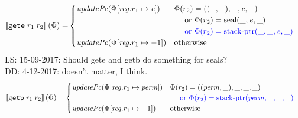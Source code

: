 \documentclass[a3paper]{article}
\newcommand\lau[1]{{\color{purple} \sf \footnotesize {LS: #1}}\\}
\newcommand\dominique[1]{{\color{purple} \sf \footnotesize {DD: #1}}\\}
\newcommand{\sem}[1]{\left\llbracket #1 \right\rrbracket}
\newcommand{\tor}{\text{ or }}
\newcommand{\totherwise}{\text{otherwise }}
\newcommand{\sourcecolor}{\color{blue}}
\newcommand{\src}[1]{{\sourcecolor #1}}
\newcommand{\targetcolor}[1]{\color{black}}
\newcommand{\trg}[1]{{\targetcolor{} #1}}
\newcommand{\zinstr}[1]{\texttt{#1}}
\newcommand{\twoinstr}[3]{
  \ifthenelse{\equal{#2#3}{}}
  {\zinstr{#1}}
  {\zinstr{#1} \; #2 \; #3}
}
\newcommand{\tgete}[2]{\twoinstr{\trg{gete}}{#1}{#2}}
\newcommand{\tgetp}[2]{\twoinstr{\trg{getp}}{#1}{#2}}
\newcommand{\update}[2]{[#1 \mapsto #2]}
\newcommand{\updReg}[2]{\update{\reg.#1}{#2}}
\newcommand{\shareddom}[1]{\mathrm{#1}}
\newcommand{\perm}{\var{perm}}
\newcommand{\stkptr}[1]{\mathrm{stack\text{-}ptr}(#1)}
\newcommand{\seal}[1]{\shareddom{seal}(#1)}
\newcommand{\var}[1]{\mathit{#1}}
\newcommand{\reg}{\var{reg}}
\newcommand{\eaddr}{\var{e}}
\newcommand{\plainfun}[2]{
  \ifthenelse{\equal{#2}{}}
  {\mathit{#1}}
  {\mathit{#1}(#2)}
}
\newcommand{\updPcAddr}[1]{\plainfun{updatePc}{#1}}
\begin{document}
\begin{align*}
  \sem{\tgete{r_1}{r_2}}(\Phi) = & 
                                   \begin{cases}
                                     \updPcAddr{\Phi\updReg{r_1}{\eaddr}} & 
                                     \arraycolsep=0pt
                                     \begin{array}[t]{l}
                                       \Phi(r_2) = ((\_,\_),\_,\eaddr,\_) \\
                                       \quad \tor \Phi(r_2) = \seal{\_,\eaddr,\_} \\
                                       \quad \src{\tor \Phi(r_2) = \stkptr{\_,\_,\eaddr,\_} } \\
                                     \end{array} \\
                                     \updPcAddr{\Phi\updReg{r_1}{-1}} & \totherwise
                                   \end{cases}
\end{align*}
\lau{15-09-2017: Should gete and getb do something for seals?}
\dominique{4-12-2017: doesn't matter, I think.}

\begin{align*}
  \sem{\tgetp{r_1}{r_2}}(\Phi) = & 
                                   \begin{cases}
                                     \updPcAddr{\Phi\updReg{r_1}{\perm}} & 
                                     \arraycolsep=0pt
                                     \begin{array}[t]{l}
                                       \Phi(r_2) = ((\perm,\_),\_,\_,\_) \\
                                       \quad \src{\tor \Phi(r_2) = \stkptr{\perm,\_,\_,\_} } \\
                                     \end{array} \\
                                     \updPcAddr{\Phi\updReg{r_1}{-1}} & \totherwise
                                   \end{cases}
\end{align*}
\end{document}
